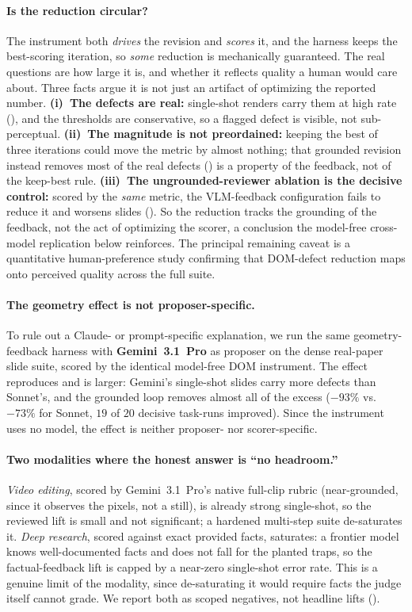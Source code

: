 \paragraph{Is the reduction circular?} The instrument both \emph{drives} the revision and \emph{scores} it, and the harness keeps the best-scoring iteration, so \emph{some} reduction is mechanically guaranteed. The real questions are how large it is, and whether it reflects quality a human would care about. Three facts argue it is not just an artifact of optimizing the reported number. \textbf{(i)~The defects are real:} single-shot renders carry them at high rate (), and the thresholds are conservative, so a flagged defect is visible, not sub-perceptual. \textbf{(ii)~The magnitude is not preordained:} keeping the best of three iterations could move the metric by almost nothing; that grounded revision instead removes most of the real defects () is a property of the feedback, not of the keep-best rule. \textbf{(iii)~The ungrounded-reviewer ablation is the decisive control:} scored by the \emph{same} metric, the VLM-feedback configuration fails to reduce it and worsens slides (). So the reduction tracks the grounding of the feedback, not the act of optimizing the scorer, a conclusion the model-free cross-model replication below reinforces. The principal remaining caveat is a quantitative human-preference study confirming that DOM-defect reduction maps onto perceived quality across the full suite.

\paragraph{The geometry effect is not proposer-specific.} To rule out a Claude- or prompt-specific explanation, we run the same geometry-feedback harness with \textbf{Gemini~3.1~Pro} as proposer on the dense real-paper slide suite, scored by the identical model-free DOM instrument. The effect reproduces and is larger: Gemini's single-shot slides carry more defects than Sonnet's, and the grounded loop removes almost all of the excess ($-93\%$ vs.\ $-73\%$ for Sonnet, $19$ of $20$ decisive task-runs improved). Since the instrument uses no model, the effect is neither proposer- nor scorer-specific.

\paragraph{Two modalities where the honest answer is ``no headroom.''} \emph{Video editing}, scored by Gemini~3.1~Pro's native full-clip rubric (near-grounded, since it observes the pixels, not a still), is already strong single-shot, so the reviewed lift is small and not significant; a hardened multi-step suite de-saturates it. \emph{Deep research}, scored against exact provided facts, saturates: a frontier model knows well-documented facts and does not fall for the planted traps, so the factual-feedback lift is capped by a near-zero single-shot error rate. This is a genuine limit of the modality, since de-saturating it would require facts the judge itself cannot grade. We report both as scoped negatives, not headline lifts ().
